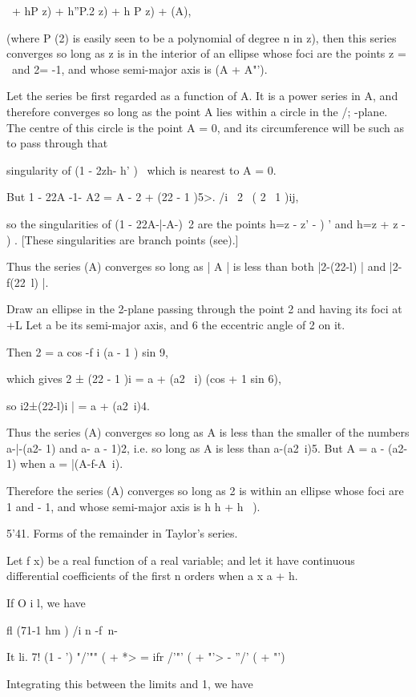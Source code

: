 {{\ + hP z) + h''P.2 z) + h P z) + (A),

(where P (2) is easily seen to be a polynomial of degree n in z), then
this series converges so long as z is in the interior of an ellipse
whose foci are the points z = \ and 2= -1, and whose semi-major axis
is (A + A"').

Let the series be first regarded as a function of A. It is a power
series in A, and therefore converges so long as the point A lies
within a circle in the /; -plane. The centre of this circle is the
point A = 0, and its circumference will be such as to pass through
that

singularity of (1 - 2zh- h' )~ which is nearest to A = 0.

But 1 - 22A -1- A2 = A - 2 + (22 - 1 )5>. /i \ 2 \ ( 2 \ 1 )ij,

so the singularities of (1 - 22A-|-A-)~2 are the points h=z - z' - ) '
and h=z + z - ) . [These singularities are branch points (see).]

Thus the series (A) converges so long as | A | is less than both
|2-(22-l) | and |2-f(22\ l) |.

Draw an ellipse in the 2-plane passing through the point 2 and having
its foci at +L Let a be its semi-major axis, and 6 the eccentric angle
of 2 on it.

Then 2 = a cos -f i (a - 1 ) sin 9,

which gives 2 ± (22 - 1 )i = a + (a2 \ i) (cos + 1 sin 6),

so i2±(22-l)i | = a + (a2\ i)4.

Thus the series (A) converges so long as A is less than the smaller of
the numbers a-|-(a2- 1) and a- a - 1)2, i.e. so long as A is less than
a-(a2\ i)5. But A = a - (a2- 1) when a = |(A-f-A~i).

Therefore the series (A) converges so long as 2 is within an ellipse
whose foci are 1 and - 1, and whose semi-major axis is h h + h~ ).

5'41. Forms of the remainder in Taylor's series.

Let f x) be a real function of a real variable; and let it have
continuous differential coefficients of the first n orders when a x a
+ h.

If O i l, we have

fl (71-1 hm ) /i n -f\ n-\

It li. 7! (1 - ') "/'"" ( + *> = ifr /'"' ( + "'> - ''/' ( + "')

Integrating this between the limits and 1, we have

}}
